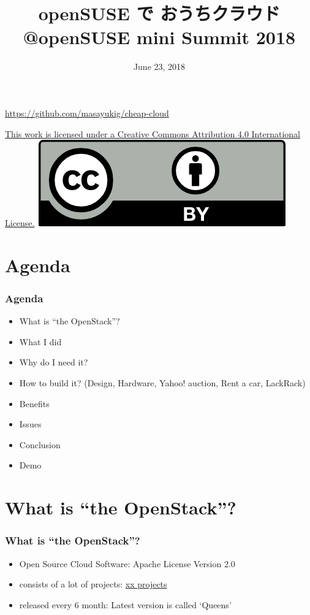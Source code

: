 \documentclass[aspectratio=169,11pt,hyperref={colorlinks=true}]{beamer}
\author[Masayuki Igawa]{%
    \texorpdfstring{%
        \begin{columns}
        \column{.45\linewidth}
            \centering
            Masayuki Igawa\\
            \href{mailto:masayuki@igawa.io}{masayuki@igawa.io}\\
            \texttt{masayukig on Freenode, GitHub, Twitter}
        \end{columns}
        }
    {Masayuki Igawa}
}
\date{June 23, 2018}
\title[private-cloud-on-openSUSE
  \hspace{2em}\insertframenumber/\inserttotalframenumber]{openSUSE で おうちクラウド
  \\ @openSUSE mini Summit 2018}
\begin{document}
{%
\begin{frame}[noframenumbering]
  \hypersetup{colorlinks,urlcolor=suse}
  \titlepage{}
  \centering
  \@place \par
  \href{https://github.com/masayukig/cheap-cloud}{https://github.com/masayukig/cheap-cloud}
  \vspace{1em}
  \begin{flushright}
    \tiny\href{https://creativecommons.org/licenses/by/4.0/}{This work
      is licensed under a Creative Commons Attribution 4.0
      International License.}~\includegraphics[scale=0.3]{cc_by.png}
  \end{flushright}
\end{frame}
}

\section{Agenda}
\begin{frame}
  \frametitle{Agenda}
  \begin{itemize}
    \item What is ``the OpenStack''?
    \item What I did
    \item Why do I need it?
    \item How to build it? (Design, Hardware, Yahoo! auction, Rent a
      car, LackRack)
    \item Benefits
    \item Issues
    \item Conclusion
    \item Demo
  \end{itemize}
\end{frame}


\section{What is ``the OpenStack''?}
\begin{frame}
  \frametitle{What is ``the OpenStack''?}
  \begin{itemize}
    \item Open Source Cloud Software: Apache License Version 2.0
    \item consists of a lot of projects: \href{http://governance.openstack.org/reference/projects/index.html}{xx projects}
    \item released every 6 month: Latest version is called `Queens'
  \end{itemize}
\end{frame}
\end{document}
